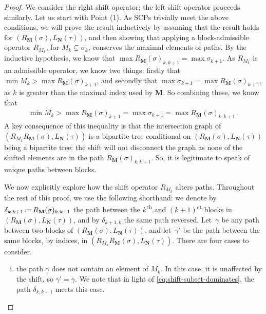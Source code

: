 \documentclass{amsart}
\theoremstyle{definition}
\newcommand{\eqdef}{\mbox{\,\raisebox{0.2ex}{\scriptsize\ensuremath{\mathrm:}}\ensuremath{=}\,}} %
\newcommand{\ordinal}{\textsuperscript{th}} %
\newcommand{\ordinalst}{\textsuperscript{st}} %
\newcommand{\SCP}{\mathrm{SCP}}
\begin{document}
\begin{proof}
We consider the right shift operator; the left shift operator proceeds similarly.
Let us start with Point (1).
As $\SCP$s trivially meet the above conditions, we will prove the result inductively by assuming that the result holds for $(R_{\mathbf{M}}(\sigma),L_{\mathbf{N}}(\tau))$, and then showing that applying a block-admissible operator $R_{M_k}$, for $M_k\subsetneq \sigma_k$,
conserves the maximal elements of paths.
By the inductive hypothesis, we know that $\max R_{\mathbf{M}}(\sigma)_{k,k+1}= \max \sigma_{k+1}$.
As $R_{M_k}$ is an admissible operator, we know two things: firstly that $\min M_k > \max R_{\mathbf{M}}(\sigma)_{k+1}$, and secondly that $\max \sigma_{k+1} = \max R_{\mathbf{M}}(\sigma)_{k+1}$, as $k$ is greater than the maximal index used by $\mathbf{M}$.
So combining these, we know that
\begin{align}
\label{eq:shift-subset-dominates}
\min M_k > \max R_{\mathbf{M}}(\sigma)_{k+1} = \max \sigma_{k+1} = \max R_{\mathbf{M}}(\sigma)_{k,k+1} \ .  \tag{W}
\end{align}
A key consequence of this inequality is that the intersection graph of $(R_{M_k}R_{\mathbf{M}}(\sigma),L_{\mathbf{N}}(\tau))$ is a bipartite tree conditional on $(R_{\mathbf{M}}(\sigma),L_{\mathbf{N}}(\tau))$ being a bipartite tree: the shift will not disconnect the graph as none of the shifted elements are in the path $R_{\mathbf{M}}(\sigma)_{k,k+1}$. 
So, it is legitimate to speak of unique paths between blocks. 

We now explicitly explore how the shift operator $R_{M_k}$ alters paths. 
Throughout the rest of this proof, we use the following shorthand: we denote by $\delta_{k,k+1} \eqdef  R_{\mathbf{M}}(\sigma)_{k,k+1}$ the path between the $k$\ordinal{} and $(k+1)$\ordinalst{} blocks in $(R_{\mathbf{M}}(\sigma),L_{\mathbf{N}}(\tau))$, and by $\delta_{k+1,k}$ the same path reversed.
Let~$\gamma$ be any path between two blocks of $(R_{\mathbf{M}}(\sigma),L_{\mathbf{N}}(\tau))$, and let~$\gamma'$ be the path between the same blocks, by indices, in $(R_{M_k}R_{\mathbf{M}}(\sigma),L_{\mathbf{N}}(\tau))$. 
There are four cases to consider. 
\begin{enumerate}[i)]
\item the path $\gamma$ does not contain an element of $M_k$.
In this case, it is unaffected by the shift, so $\gamma' = \gamma$.
We note that in light of \cref{eq:shift-subset-dominates}, the path $\delta_{k,k+1}$ meets this case.


\end{enumerate}
\end{proof}
\end{document}
